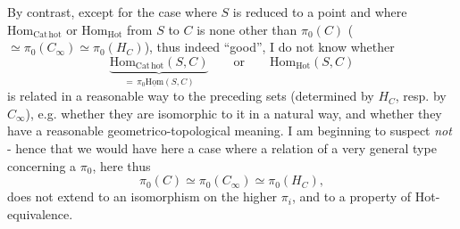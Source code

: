 \documentclass[11pt]{article}
\newcommand{\Cathot}{\mathrm{Cat\,hot}}
\newcommand{\Hot}{\mathrm{Hot}}
\newcommand{\Hom}{\mathrm{Hom}}
\newcommand{\uHom}{\underline{\mathrm{Hom}}}
\begin{document}
By contrast, except for the case where $S$ is reduced to a point and where $\Hom_{\Cathot}$ or $\Hom_{\Hot}$ from $S$ to $C$ is none other than $\pi_{0}(C)$ ($\simeq \pi_{0}(C_{\infty}) \simeq \pi_{0}(H_{C})$), thus indeed ``good'', I do not know whether
\[
\underbrace{\Hom_{\Cathot}(S,C)}_{=\,\pi_{0}\uHom(S,C)} \qquad \text{or} \qquad \Hom_{\Hot}(S,C)
\]
is related in a reasonable way to the preceding sets (determined by $H_{C}$, resp. by $C_{\infty}$), e.g. whether they are isomorphic to it in a natural way, and whether they have a reasonable geometrico-topological meaning. I am beginning to suspect \textit{not} - hence that we would have here a case where a relation of a very general type concerning a $\pi_{0}$, here thus
\[
\pi_{0}(C) \simeq \pi_{0}(C_{\infty}) \simeq \pi_{0}(H_{C}),
\]
does not extend to an isomorphism on the higher $\pi_{i}$, and to a property of Hot-equivalence.
\end{document}
